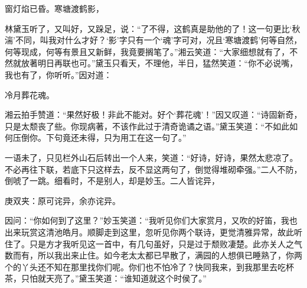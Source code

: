 \begin{poem}
    \begin{pl}窗灯焰已昏。寒塘渡鹤影，\end{pl}
\end{poem}


\begin{parag}
    林黛玉听了，又叫好，又跺足，说：“了不得，这鹤真是助他的了！这一句更比‘秋湍’不同，叫我对什么才好？‘影’字只有一个‘魂’字可对，况且‘寒塘渡鹤’何等自然，何等现成，何等有景且又新鲜，我竟要搁笔了。”湘云笑道：“大家细想就有了，不然就放著明日再联也可。”黛玉只看天，不理他，半日，猛然笑道：“你不必说嘴，我也有了，你听听。”因对道：
\end{parag}


\begin{poem}
    \begin{pl}冷月葬花魂。\end{pl}
\end{poem}


\begin{parag}
    湘云拍手赞道：“果然好极！非此不能对。好个‘葬花魂’！”因又叹道：“诗固新奇，只是太颓丧了些。你现病著，不该作此过于清奇诡谲之语。”黛玉笑道：“不如此如何压倒你。下句竟还未得，只为用工在这一句了。”
\end{parag}


\begin{parag}
    一语未了，只见栏外山石后转出一个人来，笑道：“好诗，好诗，果然太悲凉了。不必再往下联，若底下只这样去，反不显这两句了，倒觉得堆砌牵强。”二人不防，倒唬了一跳。细看时，不是别人，却是妙玉。二人皆诧异，\begin{note}庚双夹：原可诧异，余亦诧异。\end{note}因问：“你如何到了这里？”妙玉笑道：“我听见你们大家赏月，又吹的好笛，我也出来玩赏这清池皓月。顺脚走到这里，忽听见你两个联诗，更觉清雅异常，故此听住了。只是方才我听见这一首中，有几句虽好，只是过于颓败凄楚。此亦关人之气数而有，所以我出来止住。如今老太太都已早散了，满园的人想俱已睡熟了，你两个的丫头还不知在那里找你们呢。你们也不怕冷了？快同我来，到我那里去吃杯茶，只怕就天亮了。”黛玉笑道：“谁知道就这个时侯了。”
\end{parag}


